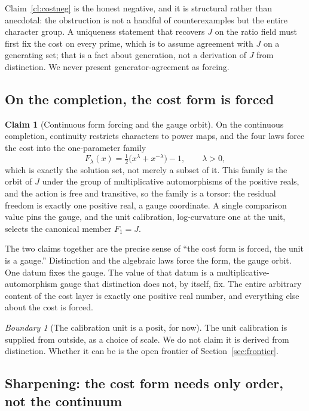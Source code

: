 \documentclass[11pt,a4paper]{article}
\theoremstyle{definition}
\newtheorem{claim}[theorem]{Claim}
\theoremstyle{remark}
\newtheorem*{boundary}{Boundary}
\begin{document}
Claim~\ref{cl:costneg} is the honest negative, and it is structural rather than
anecdotal: the obstruction is not a handful of counterexamples but the entire
character group. A uniqueness statement that recovers $J$ on the ratio field must
first fix the cost on every prime, which is to assume agreement with $J$ on a
generating set; that is a fact about generation, not a derivation of $J$ from
distinction. We never present generator-agreement as forcing.

\subsection{On the completion, the cost form is forced}

\begin{claim}[Continuous form forcing and the gauge orbit]\label{cl:costpos}
On the continuous completion, continuity restricts characters to power maps, and
the four laws force the cost into the one-parameter family
\[
  F_\lambda(x) = \tfrac{1}{2}\bigl(x^{\lambda} + x^{-\lambda}\bigr) - 1,
  \qquad \lambda > 0,
\]
which is exactly the solution set, not merely a subset of it. This family is the
orbit of $J$ under the group of multiplicative automorphisms of the positive
reals, and the action is free and transitive, so the family is a torsor: the
residual freedom is exactly one positive real, a gauge coordinate. A single
comparison value pins the gauge, and the unit calibration, log-curvature one at the
unit, selects the canonical member $F_1 = J$.
\end{claim}

The two claims together are the precise sense of ``the cost form is forced, the
unit is a gauge.'' Distinction and the algebraic laws force the form, the gauge
orbit. One datum fixes the gauge. The value of that datum is a
multiplicative-automorphism gauge that distinction does not, by itself, fix. The
entire arbitrary content of the cost layer is exactly one positive real number, and
everything else about the cost is forced.

\begin{boundary}[The calibration unit is a posit, for now]
The unit calibration is supplied from outside, as a choice of scale. We do not
claim it is derived from distinction. Whether it can be is the open frontier of
Section~\ref{sec:frontier}.
\end{boundary}

\subsection{Sharpening: the cost form needs only order, not the continuum}\label{sec:cost-monotone}
\end{document}

